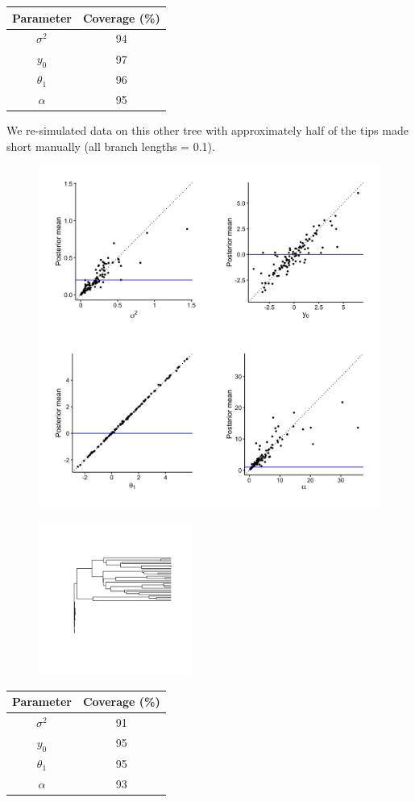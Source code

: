 \documentclass{article}
\begin{document}
\begin{center}
\begin{tabular}{c | c}
  Parameter & Coverage (\%) \\\hline
  $\sigma^2$ & 94\\
  $y_0$ & 97\\
  $\theta_1$ & 96\\
  $\alpha$ & 95
\end{tabular}
\end{center}

\newpage

\noindent We re-simulated data on this other tree with approximately half of the tips made short manually (all branch lengths = 0.1).

\begin{figure}[h]
  \centering
  \includegraphics[width=12cm]{../OUMVNVanilla_nonultra_graphs.png}
\end{figure}

\begin{figure}[h]
  \centering
  \includegraphics[width=5cm]{../OUMVNVanilla_nonultra_tree.png}
\end{figure}

\begin{center}
\begin{tabular}{c | c}
  Parameter & Coverage (\%) \\\hline
  $\sigma^2$ & 91\\
  $y_0$ & 95\\
  $\theta_1$ & 95\\
  $\alpha$ & 93
\end{tabular}
\end{center}
\end{document}
